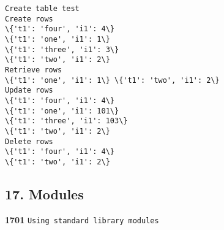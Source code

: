 \documentclass[11pt]{article}
\begin{document}
    \begin{Verbatim}[commandchars=\\\{\}]
Create table test
Create rows
\{'t1': 'four', 'i1': 4\}
\{'t1': 'one', 'i1': 1\}
\{'t1': 'three', 'i1': 3\}
\{'t1': 'two', 'i1': 2\}
Retrieve rows
\{'t1': 'one', 'i1': 1\} \{'t1': 'two', 'i1': 2\}
Update rows
\{'t1': 'four', 'i1': 4\}
\{'t1': 'one', 'i1': 101\}
\{'t1': 'three', 'i1': 103\}
\{'t1': 'two', 'i1': 2\}
Delete rows
\{'t1': 'four', 'i1': 4\}
\{'t1': 'two', 'i1': 2\}

    \end{Verbatim}

    \hypertarget{modules}{%
\subsection{17. Modules}\label{modules}}

    \textbf{1701} \texttt{Using\ standard\ library\ modules}
\end{document}
